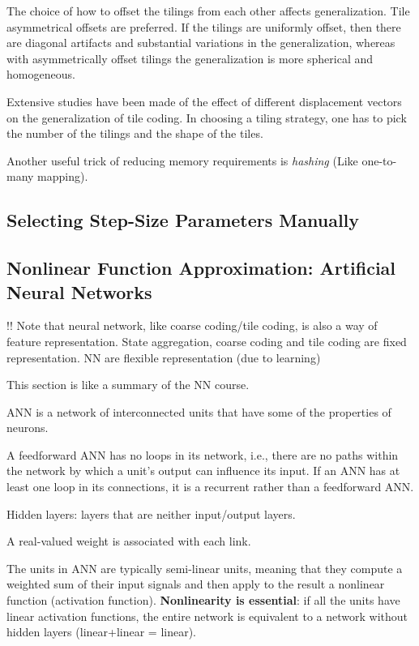 \documentclass[sutton_barto_notes.tex]{subfiles}
\begin{document}
The choice of how to offset the tilings from each other affects generalization. Tile asymmetrical offsets are preferred. If the tilings are uniformly offset, then there are diagonal artifacts and substantial variations in the generalization, whereas with asymmetrically offset tilings the generalization is more spherical and homogeneous.

Extensive studies have been made of the effect of different displacement vectors on the generalization of tile coding.
In choosing a tiling strategy, one has to pick the number of the tilings and the shape of the tiles.

Another useful trick of reducing memory requirements is \textit{hashing} (Like one-to-many mapping).

\subsection{Selecting Step-Size Parameters Manually}

\subsection{Nonlinear Function Approximation: Artificial Neural Networks}

!! Note that neural network, like coarse coding/tile coding, is also a way of feature representation. State aggregation, coarse coding and tile coding are fixed representation. NN are flexible representation (due to learning)

This section is like a summary of the NN course. 

ANN is a network of interconnected units that have some of the properties of neurons.

A feedforward ANN has no loops in its network, i.e., there are no paths within the network by which a unit's output can influence its input. If an ANN has at least one loop in its connections, it is a recurrent rather than a feedforward ANN.

Hidden layers: layers that are neither input/output layers.

A real-valued weight is associated with each link.

The units in ANN are typically semi-linear units, meaning that they compute a weighted sum of their input signals and then apply to the result a nonlinear function (activation function). \textbf{Nonlinearity is essential}: if all the units have linear activation functions, the entire network is equivalent to a network without hidden layers (linear+linear = linear).
\end{document}
